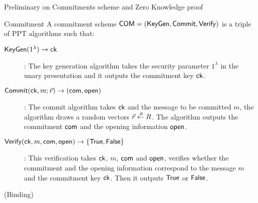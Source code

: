 \begin{section}{Preliminary on Commitments scheme and Zero Knowledge proof}
	\begin{definition}{\textsf{Commitment}}
	A commitment scheme $\mathsf{COM} = ({\mathsf{KeyGen}}, {\mathsf{Commit}}, {\mathsf{Verify}})$ is a triple of PPT algorithms such that:
	\begin{description}
		\item[${\mathsf{KeyGen}}	(1^\lambda) \to \mathsf{ck}$]: The key generation algorithm takes the security parameter $1^\lambda$ in the unary presentation and it outputs the commitment key $\mathsf{ck}$.
		\item[${\mathsf{Commit}}(\mathsf{ck}, m; \vec{r}) \to (\mathsf{com}, \mathsf{open})$]: The commit algorithm takes $\mathsf{ck}$ and the message to be committed $m$, the algorithm draws a random vectors $\vec{r} \stackrel{{\scriptscriptstyle \mkern4mu R}}{\gets} R$. The algorithm outputs the commitment $\mathsf{com}$ and the opening information $\mathsf{open}$.
		\item[${\mathsf{Verify}}(\mathsf{ck}, m, \mathsf{com}, \mathsf{open}) \to \{\mathsf{True}, \mathsf{False}\}$]: This verification takes $\mathsf{ck}$, $m$, $\mathsf{com}$ and $\mathsf{open}$, verifies whether the commitment and the opening information correspond to the message $m$ and the commitment key $\mathsf{ck}$. Then it outputs $\mathsf{True}$ or $\mathsf{False}$.
	\end{description}	
	\end{definition}

        \begin{definition}{\textsf{(Binding)}}
          
        \end{definition}


\end{section}



